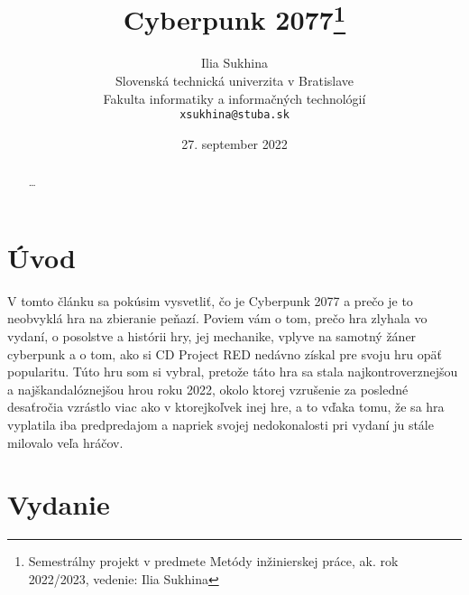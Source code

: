 \documentclass[10pt,twoside,slovak,a4paper]{article}
\title{Cyberpunk 2077\thanks{Semestrálny projekt v predmete Metódy inžinierskej práce, ak. rok 2022/2023, vedenie: Ilia Sukhina}} %
\author{Ilia Sukhina\\[2pt]
	{\small Slovenská technická univerzita v Bratislave}\\
	{\small Fakulta informatiky a informačných technológií}\\
	{\small \texttt{xsukhina@stuba.sk}}
	}
\date{\small 27. september 2022} %
\begin{document}
\maketitle

\begin{abstract}
\ldots
\end{abstract}



\section{Úvod}

V tomto článku sa pokúsim vysvetliť, čo je Cyberpunk 2077 a prečo je to neobvyklá hra na zbieranie peňazí. Poviem vám o tom, prečo hra zlyhala vo vydaní, o posolstve a histórii hry, jej mechanike, vplyve na samotný žáner cyberpunk a o tom, ako si CD Project RED nedávno získal pre svoju hru opäť popularitu. Túto hru som si vybral, pretože táto hra sa stala najkontroverznejšou a najškandalóznejšou hrou roku 2022, okolo ktorej vzrušenie za posledné desaťročia vzrástlo viac ako v ktorejkoľvek inej hre, a to vďaka tomu, že sa hra vyplatila iba predpredajom a napriek svojej nedokonalosti pri vydaní ju stále milovalo veľa hráčov.


\section{Vydanie} \label{vydanie}
\end{document}
